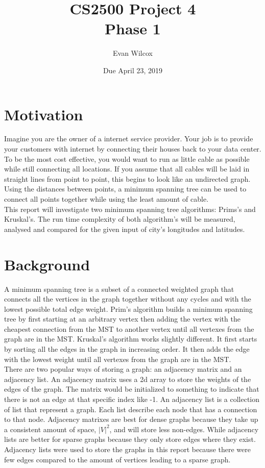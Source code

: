 \documentclass[a4paper]{article}
\title{CS2500 Project 4 \\ Phase 1}
\author{Evan Wilcox}
\date{Due April 23, 2019}
\begin{document}
    \maketitle

    \section{Motivation}
    Imagine you are the owner of a internet service provider. Your job is to provide 
    your customers with internet by connecting their houses back to your data center.
    To be the most cost effective, you would want to run as little cable as possible 
    while still connecting all locations. If you assume that all cables will be laid 
    in straight lines from point to point, this begins to look like an undirected graph.
    Using the distances between points, a minimum spanning tree can be used to connect
    all points together while using the least amount of cable. \\

    This report will investigate two minimum spanning tree algorithms: Prims's and 
    Kruskal's. The run time complexity of both algorithm's will
    be measured, analysed and compared for the given input of city's longitudes and 
    latitudes.


    \section{Background}
    A minimum spanning tree is a subset of a connected weighted graph that connects 
    all the vertices in the graph together without any cycles and with the lowest
    possible total edge weight. Prim's algorithm builds a minimum spanning tree by 
    first starting at an arbitrary vertex then adding the vertex with the cheapest 
    connection from the MST to another vertex until all vertexes from the graph are
    in the MST. Kruskal's algorithm works slightly different. It first starts by sorting all the
    edges in the graph in increasing order. It then adds the edge with the lowest 
    weight until all vertexes from the graph are in the MST. \\

    There are two popular ways of storing a graph: an adjacency matrix and an 
    adjacency list. An adjacency matrix uses a 2d array to store the weights of the 
    edges of the graph. The matrix would be initialized to something to indicate that
    there is not an edge at that specific index like -1. An adjacency list is a 
    collection of list that represent a graph. Each list describe each node that has
    a connection to that node. Adjacency matrixes are best for dense graphs because 
    they take up a consistent amount of space, $|V|^{2}$, and will store less non-edges.
    While adjacency lists are better for sparse graphs because they only store edges
    where they exist. Adjacency lists were used to store the graphs in this report
    because there were few edges compared to the amount of vertices leading to a sparse
    graph. 
\end{document}
